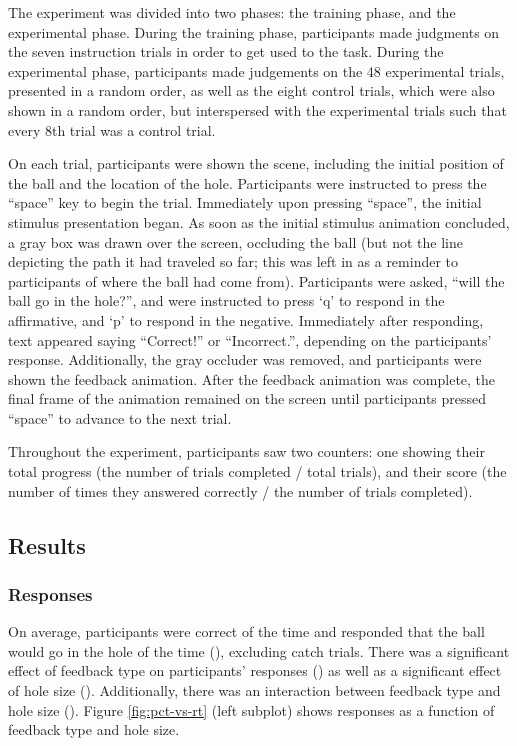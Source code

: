 \documentclass[10pt,letterpaper]{article}
\begin{document}
The experiment was divided into two phases: the training phase, and the experimental phase. During the training phase, participants made judgments on the seven instruction trials in order to get used to the task. During the experimental phase, participants made judgements on the 48 experimental trials, presented in a random order, as well as the eight control trials, which were also shown in a random order, but interspersed with the experimental trials such that every 8th trial was a control trial.

On each trial, participants were shown the scene, including the initial position of the ball and the location of the hole. Participants were instructed to press the ``space'' key to begin the trial. Immediately upon pressing ``space'', the initial stimulus presentation began. As soon as the initial stimulus animation concluded, a gray box was drawn over the screen, occluding the ball (but not the line depicting the path it had traveled so far; this was left in as a reminder to participants of where the ball had come from). Participants were asked, ``will the ball go in the hole?'', and were instructed to press `q' to respond in the affirmative, and `p' to respond in the negative. Immediately after responding, text appeared saying ``Correct!'' or ``Incorrect.'', depending on the participants' response. Additionally, the gray occluder was removed, and participants were shown the feedback animation. After the feedback animation was complete, the final frame of the animation remained on the screen until participants pressed ``space'' to advance to the next trial. 

Throughout the experiment, participants saw two counters: one showing their total progress (the number of trials completed / total trials), and their score (the number of times they answered correctly / the number of trials completed).

\subsection{Results}

\subsubsection{Responses}

On average, participants were correct \AvgCorrect{} of the time and responded that the ball would go in the hole \AvgResponse{} of the time (\ResponseN{}), excluding catch trials. There was a significant effect of feedback type on participants' responses (\ResponseHoleClass{}) as well as a significant effect of hole size (\ResponseHoleSize{}). Additionally, there was an interaction between feedback type and hole size (\ResponseFull{}). Figure \ref{fig:pct-vs-rt} (left subplot) shows responses as a function of feedback type and hole size.
\end{document}
